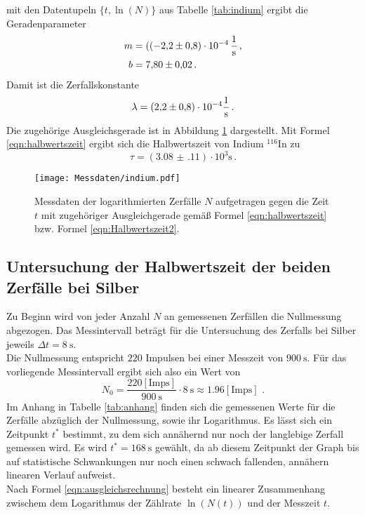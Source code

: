 mit den Datentupeln $\{ t, \ln (N)\}$ aus Tabelle \ref{tab:indium} ergibt die Geradenparameter
\begin{align*}
	m &= (\SI{-2,2(8)E-04}{\per\second}  \, \mathrm{,} \\
	b &= \num{7,80(2)} \, \mathrm{.}
\end{align*}
Damit ist die Zerfallskonstante
\begin{equation*}
	\lambda = (\num{2,2(8)}) \cdot 10^{-4} \si{\per\second}  \, \mathrm{.} \\
\end{equation*}
Die zugehörige Ausgleichsgerade ist in Abbildung \ref{fig:indium} dargestellt.
Mit Formel \eqref{eqn:halbwertszeit} ergibt sich die Halbwertszeit von Indium $^{116}\mathrm{In}$
zu
\begin{equation*}
	\tau =  (\num{3.08(11)}) \cdot 10^3 \si{\second} \, \mathrm{.}
\end{equation*}
\begin{figure}
	\centering
	\texttt{[image: Messdaten/indium.pdf]}
	\caption{Messdaten der logarithmierten Zerfälle $N$ aufgetragen gegen die Zeit $t$ mit zugehöriger Ausgleichgerade gemäß Formel \eqref{eqn:halbwertszeit} bzw. Formel \eqref{eqn:Halbwertszeit2}.}
	\label{fig:indium}
\end{figure}






\subsection{Untersuchung der Halbwertszeit der beiden Zerfälle bei Silber}
Zu Beginn wird von jeder Anzahl $N$ an gemessenen Zerfällen die Nullmessung abgezogen.
Das Messintervall beträgt für die Untersuchung des Zerfalls bei Silber jeweils $\Delta t = \SI{8}{\second}$.\\
Die Nullmessung entspricht $220$ Impulsen bei einer Messzeit von $\SI{900}{\second}$.
Für das vorliegende Messintervall ergibt sich also ein Wert von
\begin{equation*}
	N_0=\frac{220\mathrm{ [Imps]}}{\SI{900}{\second}}\cdot \SI{8}{\second}\approx 1.96\mathrm{ [Imps]}\text{ .}
\end{equation*}
Im Anhang in Tabelle \ref{tab:anhang} finden sich die gemessenen Werte für die Zerfälle abzüglich der Nullmessung, sowie ihr Logarithmus.
Es lässt sich ein Zeitpunkt $t^{*}$ bestimmt, zu dem sich annähernd nur noch der langlebige Zerfall gemessen wird.
Es wird $t^{*}=\SI{168}{\second}$ gewählt, da ab diesem Zeitpunkt der Graph bis auf statistische Schwankungen nur noch einen schwach fallenden, annähern linearen Verlauf aufweist.\\
Nach Formel \eqref{eqn:ausgleichsrechnung} besteht ein linearer Zusammenhang zwischem dem Logarithmus der Zählrate $\ln{(N(t))}$ und der Messzeit $t$.


